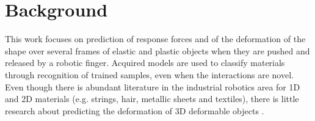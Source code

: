 \documentclass[journal]{IEEEtran}
\begin{document}
%




\section{Background}
\label{sec:background}
This work focuses on prediction of response forces and of the deformation of the shape over several frames of elastic and plastic objects when they are pushed and released by a robotic finger.  Acquired models are used to classify materials through recognition of trained samples, even when the interactions are novel.  Even though there is abundant literature in the industrial robotics area for 1D and 2D materials (e.g. strings, hair, metallic sheets and textiles), there is little research about predicting the deformation of 3D deformable objects \cite{Khalil2010review}.
\end{document}
